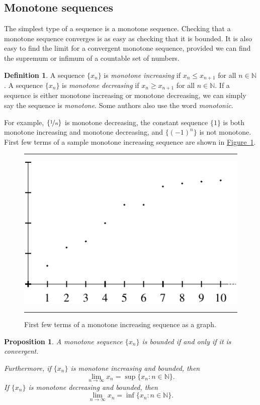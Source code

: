 \documentclass[12pt]{book}
\newenvironment{myfigureht}{%
\begin{figure}[h!t]
\noindent\rule{\textwidth}{0.4pt}\vspace{12pt}\par\centering}%
{\par\noindent\rule{\textwidth}{0.4pt}
\end{figure}}
\newcommand{\N}{{\mathbb{N}}}
\theoremstyle{plain}
\newtheorem{prop}[thm]{Proposition}
\theoremstyle{remark}
\theoremstyle{definition}
\newtheorem{defn}[thm]{Definition}
\theoremstyle{exercise}
\theoremstyle{example}
\newcommand{\figureref}[1]{\hyperref[#1]{Figure~\ref*{#1}}}
\begin{document}
\subsection{Monotone sequences}

The simplest type of a sequence is a monotone sequence.  Checking that
a monotone sequence converges is as easy as checking that it is bounded.
It is also easy to find
the limit for a convergent
monotone sequence, provided we can find the supremum or infimum
of a countable set of numbers.

\begin{defn}
A sequence $\{ x_n \}$ is \emph{monotone increasing} if $x_n \leq x_{n+1}$ for all $n \in \N$.  
%
A sequence $\{ x_n \}$ is \emph{monotone decreasing} if $x_n \geq x_{n+1}$ for all $n \in \N$.  
%
If a sequence is either monotone increasing or monotone decreasing, we
can simply say the sequence is \emph{monotone}.  Some
authors also use the word \emph{monotonic}.
\end{defn}

For example, $\{ \nicefrac{1}{n} \}$ is monotone decreasing,
the constant sequence $\{ 1 \}$ is both monotone increasing and monotone
decreasing, and $\{ {(-1)}^n \}$ is not monotone.
First few terms of a sample monotone increasing sequence
are shown in 
\figureref{figsequenceincreasing}.

\begin{myfigureht}
\includegraphics{figures/sequence-increasing}
\caption{First few terms of a monotone increasing sequence as a
graph.\label{figsequenceincreasing}}
\end{myfigureht}

\begin{prop} \label{prop:monotoneconv}
A monotone sequence $\{ x_n \}$ is bounded if and only if it is convergent.

Furthermore, if $\{ x_n \}$ is monotone increasing and bounded, then
\begin{equation*}
\lim_{n\to \infty} x_n = \sup \{ x_n : n \in \N \} .
\end{equation*}
If $\{ x_n \}$ is monotone decreasing and bounded, then
\begin{equation*}
\lim_{n\to \infty} x_n = \inf \{ x_n : n \in \N \} .
\end{equation*}
\end{prop}
\end{document}
